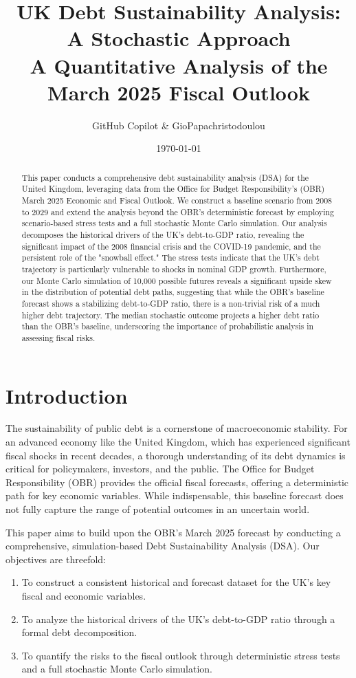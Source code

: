 \documentclass[12pt, a4paper]{article}
\title{UK Debt Sustainability Analysis: A Stochastic Approach \\ \large A Quantitative Analysis of the March 2025 Fiscal Outlook}
\author{GitHub Copilot & GioPapachristodoulou}
\date{\today}
\begin{document}
\maketitle
\thispagestyle{empty}
\newpage

\begin{abstract}
\noindent This paper conducts a comprehensive debt sustainability analysis (DSA) for the United Kingdom, leveraging data from the Office for Budget Responsibility's (OBR) March 2025 Economic and Fiscal Outlook. We construct a baseline scenario from 2008 to 2029 and extend the analysis beyond the OBR's deterministic forecast by employing scenario-based stress tests and a full stochastic Monte Carlo simulation. Our analysis decomposes the historical drivers of the UK's debt-to-GDP ratio, revealing the significant impact of the 2008 financial crisis and the COVID-19 pandemic, and the persistent role of the "snowball effect." The stress tests indicate that the UK's debt trajectory is particularly vulnerable to shocks in nominal GDP growth. Furthermore, our Monte Carlo simulation of 10,000 possible futures reveals a significant upside skew in the distribution of potential debt paths, suggesting that while the OBR's baseline forecast shows a stabilizing debt-to-GDP ratio, there is a non-trivial risk of a much higher debt trajectory. The median stochastic outcome projects a higher debt ratio than the OBR's baseline, underscoring the importance of probabilistic analysis in assessing fiscal risks.
\end{abstract}

\newpage
\tableofcontents
\newpage

\section{Introduction}
The sustainability of public debt is a cornerstone of macroeconomic stability. For an advanced economy like the United Kingdom, which has experienced significant fiscal shocks in recent decades, a thorough understanding of its debt dynamics is critical for policymakers, investors, and the public. The Office for Budget Responsibility (OBR) provides the official fiscal forecasts, offering a deterministic path for key economic variables. While indispensable, this baseline forecast does not fully capture the range of potential outcomes in an uncertain world.

This paper aims to build upon the OBR's March 2025 forecast by conducting a comprehensive, simulation-based Debt Sustainability Analysis (DSA). Our objectives are threefold:
\begin{enumerate}
    \item To construct a consistent historical and forecast dataset for the UK's key fiscal and economic variables.
    \item To analyze the historical drivers of the UK's debt-to-GDP ratio through a formal debt decomposition.
    \item To quantify the risks to the fiscal outlook through deterministic stress tests and a full stochastic Monte Carlo simulation.
\end{enumerate}
\end{document}
